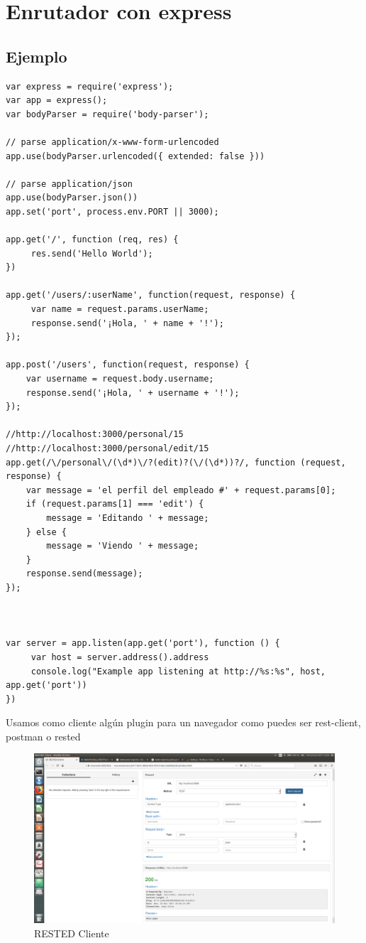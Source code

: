 \documentclass[4paper]{article}
\newcommand{\s}{express}
\begin{document}
\section{Enrutador con \s}
\subsection{Ejemplo}
\begin{verbatim}
var express = require('express');
var app = express();
var bodyParser = require('body-parser');

// parse application/x-www-form-urlencoded 
app.use(bodyParser.urlencoded({ extended: false }))
 
// parse application/json 
app.use(bodyParser.json())
app.set('port', process.env.PORT || 3000);

app.get('/', function (req, res) {
     res.send('Hello World');
})

app.get('/users/:userName', function(request, response) {
     var name = request.params.userName;
     response.send('¡Hola, ' + name + '!');
});

app.post('/users', function(request, response) {
    var username = request.body.username;
    response.send('¡Hola, ' + username + '!');
});

//http://localhost:3000/personal/15
//http://localhost:3000/personal/edit/15
app.get(/\/personal\/(\d*)\/?(edit)?(\/(\d*))?/, function (request, response) {
    var message = 'el perfil del empleado #' + request.params[0];
    if (request.params[1] === 'edit') {
        message = 'Editando ' + message;
    } else {
        message = 'Viendo ' + message;
    }
    response.send(message);
});



var server = app.listen(app.get('port'), function () {
     var host = server.address().address
     console.log("Example app listening at http://%s:%s", host, app.get('port'))
})

\end{verbatim}
Usamos como cliente algún plugin para un navegador como puedes ser rest-client, postman o rested
\begin{figure}[H]
  \centering
    \includegraphics[scale=0.2]{post.png}
  \caption{RESTED Cliente}
  \label{fig:ejemplo}
\end{figure}
\newpage
\end{document}
